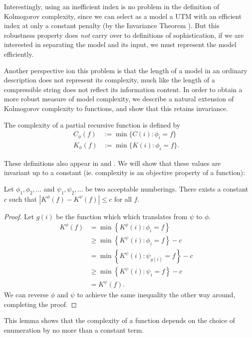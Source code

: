 \documentclass{style/llncs}
\begin{document}
Interestingly, using an inefficient index is no problem in the definition of Kolmogorov complexity, since we can select as a model a UTM with an efficient index at only a constant penalty (by the Invariance Theorem \cite{li1993introduction}). But this robustness property does \emph{not} carry over to definitions of sophistication, if we are interested in separating the model and its input, we must represent the model efficiently. 

Another perspective ion this problem is that the length of a model in an ordinary description does not represent its complexity, much like the length of a compressible string does not reflect its information content. In order to obtain a more robust measure of model complexity, we describe a natural extension of Kolmogorov complexity to functions, and show that this retains invariance.

\begin{definition}
  The complexity of a partial recursive function is defined by
  \begin{align*}
    C_\phi(f) &:= \min\{C(i):\phi_i=f\}\\
    K_\phi(f) &:= \min\{K(i):\phi_i=f\}.
  \end{align*} \label{definition:model-complexity}
\end{definition}
These definitions also appear in \cite{grunwald2004shannon} and \cite{vitanyi2004meaningful}. We will show that these values are invariant up to a constant (ie. complexity is an objective property of a function):
\begin{lemma}[Invariance]
Let $\phi_1, \phi_2, \ldots$ and $\psi_1, \psi_2,\ldots$ be two acceptable numberings. There exists a constant $c$ such that $\left| K^\phi(f) - K^\psi(f)\right | \leq c$ for all $f$. \label{lemma:invariance}
\end{lemma}
\begin{proof}
Let $g(i)$ be the function which which translates from $\psi$ to $\phi$.
\begin{align*}
K^\phi(f) &= \min\left\{ K^\phi(i) : \phi_i= f\right\} \\
&\geq \min\left\{ K^\psi(i) : \phi_i= f\right\} - c\\
&= \min\left\{ K^\psi(i) : \psi_{g(i)}= f\right\} - c\\
&\geq \min\left\{ K^\psi(i) : \psi_i= f\right\} - c\\
&= K^\psi(f).
\end{align*}
We can reverse $\phi$ and $\psi$ to achieve the same inequality the other way around, completing the proof.
\end{proof}
This lemma shows that the complexity of a function depends on the choice of
enumeration by no more than a constant term.
\end{document}
